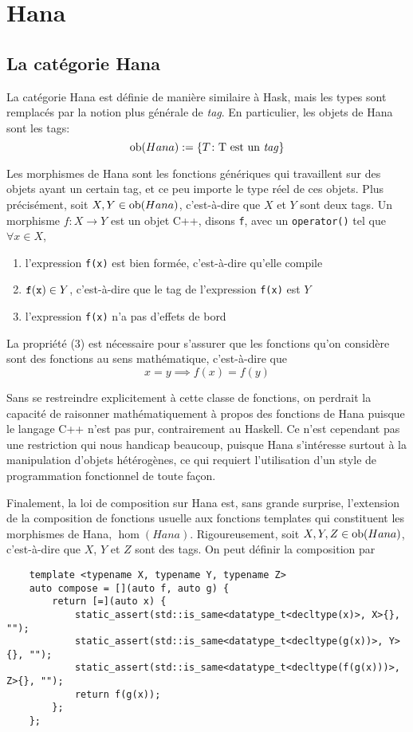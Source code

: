 \section{Hana}


\subsection{La catégorie Hana}
La catégorie Hana est définie de manière similaire à Hask, mais les types
sont remplacés par la notion plus générale de \textit{tag}. En particulier,
les objets de Hana sont les tags:
\[
    \mathrm{ob}(Hana) := \{ T \colon \text{T est un \textit{tag}} \}
\]

Les morphismes de Hana sont les fonctions génériques qui travaillent sur des
objets ayant un certain tag, et ce peu importe le type réel de ces objets.
Plus précisément, soit $X, Y \in \mathrm{ob}(Hana)$, c'est-à-dire que $X$ et $Y$
sont deux tags. Un morphisme $f : X \to Y$ est un objet C++, disons {\tt f},
avec un {\tt operator()} tel que $\forall x \in X$,
\begin{enumerate}
    \item l'expression {\tt f(x)} est bien formée, c'est-à-dire qu'elle compile
    \item ${\tt f(x)} \in Y$, c'est-à-dire que le tag de l'expression {\tt f(x)} est $Y$
    \item l'expression {\tt f(x)} n'a pas d'effets de bord
\end{enumerate}

La propriété (3) est nécessaire pour s'assurer que les fonctions qu'on
considère sont des fonctions au sens mathématique, c'est-à-dire que
\[
    x = y \implies f(x) = f(y)
\]

Sans se restreindre explicitement à cette classe de fonctions, on perdrait la
capacité de raisonner mathématiquement à propos des fonctions de Hana puisque
le langage C++ n'est pas pur, contrairement au Haskell. Ce n'est cependant pas
une restriction qui nous handicap beaucoup, puisque Hana s'intéresse surtout à
la manipulation d'objets hétérogènes, ce qui requiert l'utilisation d'un style
de programmation fonctionnel de toute façon.

Finalement, la loi de composition sur Hana est, sans grande surprise,
l'extension de la composition de fonctions usuelle aux fonctions templates
qui constituent les morphismes de Hana, $\hom(Hana)$. Rigoureusement, soit
$X, Y, Z \in \mathrm{ob}(Hana)$, c'est-à-dire que $X$, $Y$ et $Z$ sont des tags.
On peut définir la composition par
\begin{verbatim}
    template <typename X, typename Y, typename Z>
    auto compose = [](auto f, auto g) {
        return [=](auto x) {
            static_assert(std::is_same<datatype_t<decltype(x)>, X>{}, "");
            static_assert(std::is_same<datatype_t<decltype(g(x))>, Y>{}, "");
            static_assert(std::is_same<datatype_t<decltype(f(g(x)))>, Z>{}, "");
            return f(g(x));
        };
    };
\end{verbatim}

